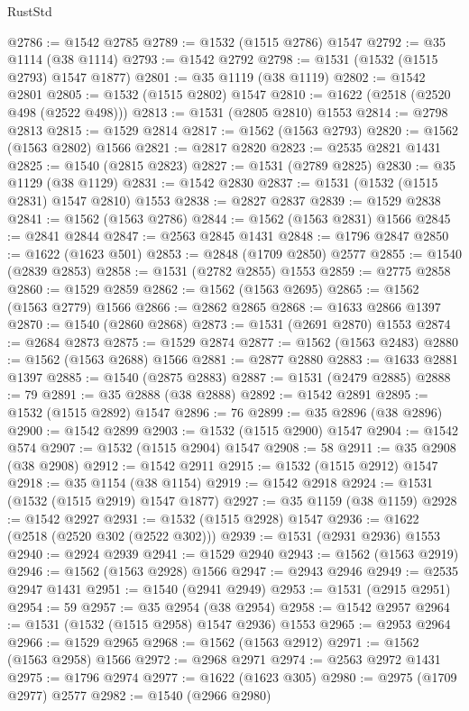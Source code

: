 \begin{lexlean}{RustStd}
\begin{coremodule}
{\begin{coremodule}
{{{{{{{{{{{{{{{{{{{{{{{{{{{{{{{{@2786 := @1542 @2785
@2789 := @1532 (@1515 @2786) @1547
@2792 := @35 @1114 (@38 @1114)
@2793 := @1542 @2792
@2798 := @1531 (@1532 (@1515 @2793) @1547 @1877)
@2801 := @35 @1119 (@38 @1119)
@2802 := @1542 @2801
@2805 := @1532 (@1515 @2802) @1547
@2810 := @1622 (@2518 (@2520 @498 (@2522 @498)))
@2813 := @1531 (@2805 @2810) @1553
@2814 := @2798 @2813
@2815 := @1529 @2814
@2817 := @1562 (@1563 @2793)
@2820 := @1562 (@1563 @2802) @1566
@2821 := @2817 @2820
@2823 := @2535 @2821 @1431
@2825 := @1540 (@2815 @2823)
@2827 := @1531 (@2789 @2825)
@2830 := @35 @1129 (@38 @1129)
@2831 := @1542 @2830
@2837 := @1531 (@1532 (@1515 @2831) @1547 @2810) @1553
@2838 := @2827 @2837
@2839 := @1529 @2838
@2841 := @1562 (@1563 @2786)
@2844 := @1562 (@1563 @2831) @1566
@2845 := @2841 @2844
@2847 := @2563 @2845 @1431
@2848 := @1796 @2847
@2850 := @1622 (@1623 @501)
@2853 := @2848 (@1709 @2850) @2577
@2855 := @1540 (@2839 @2853)
@2858 := @1531 (@2782 @2855) @1553
@2859 := @2775 @2858
@2860 := @1529 @2859
@2862 := @1562 (@1563 @2695)
@2865 := @1562 (@1563 @2779) @1566
@2866 := @2862 @2865
@2868 := @1633 @2866 @1397
@2870 := @1540 (@2860 @2868)
@2873 := @1531 (@2691 @2870) @1553
@2874 := @2684 @2873
@2875 := @1529 @2874
@2877 := @1562 (@1563 @2483)
@2880 := @1562 (@1563 @2688) @1566
@2881 := @2877 @2880
@2883 := @1633 @2881 @1397
@2885 := @1540 (@2875 @2883)
@2887 := @1531 (@2479 @2885)
@2888 := 79
@2891 := @35 @2888 (@38 @2888)
@2892 := @1542 @2891
@2895 := @1532 (@1515 @2892) @1547
@2896 := 76
@2899 := @35 @2896 (@38 @2896)
@2900 := @1542 @2899
@2903 := @1532 (@1515 @2900) @1547
@2904 := @1542 @574
@2907 := @1532 (@1515 @2904) @1547
@2908 := 58
@2911 := @35 @2908 (@38 @2908)
@2912 := @1542 @2911
@2915 := @1532 (@1515 @2912) @1547
@2918 := @35 @1154 (@38 @1154)
@2919 := @1542 @2918
@2924 := @1531 (@1532 (@1515 @2919) @1547 @1877)
@2927 := @35 @1159 (@38 @1159)
@2928 := @1542 @2927
@2931 := @1532 (@1515 @2928) @1547
@2936 := @1622 (@2518 (@2520 @302 (@2522 @302)))
@2939 := @1531 (@2931 @2936) @1553
@2940 := @2924 @2939
@2941 := @1529 @2940
@2943 := @1562 (@1563 @2919)
@2946 := @1562 (@1563 @2928) @1566
@2947 := @2943 @2946
@2949 := @2535 @2947 @1431
@2951 := @1540 (@2941 @2949)
@2953 := @1531 (@2915 @2951)
@2954 := 59
@2957 := @35 @2954 (@38 @2954)
@2958 := @1542 @2957
@2964 := @1531 (@1532 (@1515 @2958) @1547 @2936) @1553
@2965 := @2953 @2964
@2966 := @1529 @2965
@2968 := @1562 (@1563 @2912)
@2971 := @1562 (@1563 @2958) @1566
@2972 := @2968 @2971
@2974 := @2563 @2972 @1431
@2975 := @1796 @2974
@2977 := @1622 (@1623 @305)
@2980 := @2975 (@1709 @2977) @2577
@2982 := @1540 (@2966 @2980)
}}}}}}}}}}}}}}}}}}}}}}}}}}}}}}}}
\end{coremodule}}
\end{coremodule}
\end{lexlean}
